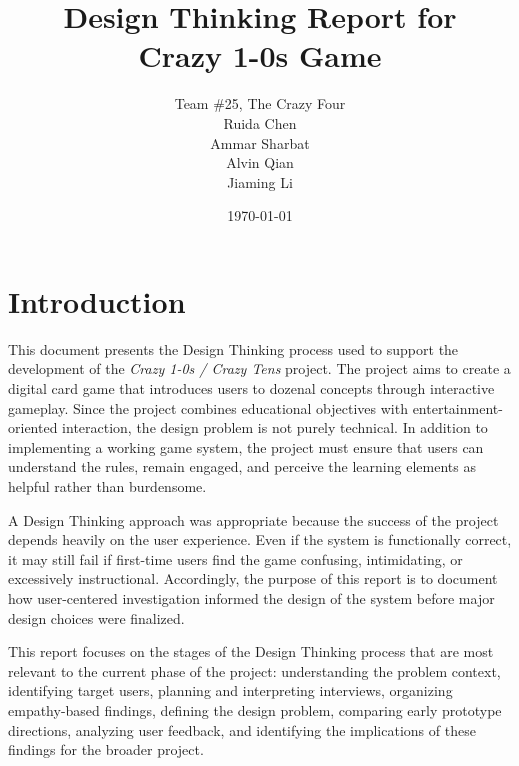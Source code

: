 \documentclass[12pt]{article}
\begin{document}
    \title{Design Thinking Report for \\ Crazy 1-0s Game}
    \author{
        Team \#25, The Crazy Four \\[1ex]
        Ruida Chen \\
        Ammar Sharbat \\
        Alvin Qian \\
        Jiaming Li \\
    }
    \date{\today}

    \maketitle
    \thispagestyle{empty}
    \newpage

    \tableofcontents
    \newpage

    \section{Introduction}

    This document presents the Design Thinking process used to support the development of the \textit{Crazy 1-0s / Crazy Tens} project. The project aims to create a digital card game that introduces users to dozenal concepts through interactive gameplay. Since the project combines educational objectives with entertainment-oriented interaction, the design problem is not purely technical. In addition to implementing a working game system, the project must ensure that users can understand the rules, remain engaged, and perceive the learning elements as helpful rather than burdensome.

    A Design Thinking approach was appropriate because the success of the project depends heavily on the user experience. Even if the system is functionally correct, it may still fail if first-time users find the game confusing, intimidating, or excessively instructional. Accordingly, the purpose of this report is to document how user-centered investigation informed the design of the system before major design choices were finalized.

    This report focuses on the stages of the Design Thinking process that are most relevant to the current phase of the project: understanding the problem context, identifying target users, planning and interpreting interviews, organizing empathy-based findings, defining the design problem, comparing early prototype directions, analyzing user feedback, and identifying the implications of these findings for the broader project.
\end{document}
